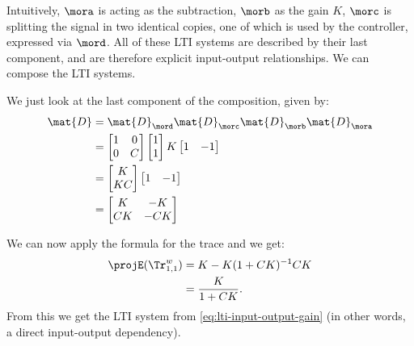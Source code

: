 {\begin{example}
        Intuitively, $\mora$ is acting as the subtraction, $\morb$ as the gain $K$, $\morc$ is splitting the signal in two identical copies, one of which is used by the controller, expressed via $\mord$.
        All of these LTI systems are described by their last component, and are therefore explicit input-output relationships.
        We can compose the LTI systems.

        We just look at the last component of the composition, given by:
        \begin{equation*}
            \begin{aligned}
                \mat{D} & =\mat{D}_\mord \mat{D}_\morc \mat{D}_\morb \mat{D}_\mora \\
                        & =\begin{bmatrix}1 & 0\\ 0 & {C}\end{bmatrix} \begin{bmatrix} 1\\ 1 \end{bmatrix} K \begin{bmatrix} 1 & -1 \end{bmatrix} \\
                        & =\begin{bmatrix}K \\ {KC}\end{bmatrix}\begin{bmatrix} 1 & -1 \end{bmatrix} \\
                        & =\begin{bmatrix}
                               K  & -K  \\
                               CK & -CK
                           \end{bmatrix}
            \end{aligned}
        \end{equation*}

        We can now apply the formula for the trace and we get:
        \begin{equation*}
            \begin{aligned}
                \projE(\Tr_{1,1}^{w}) & =K - K(1+CK)^{-1}
                CK \\
                                      & =\frac{K}{1+CK}.
            \end{aligned}
        \end{equation*}
        From this we get the LTI system from \cref{eq:lti-input-output-gain} (in other words, a direct input-output dependency).


\end{example}}

